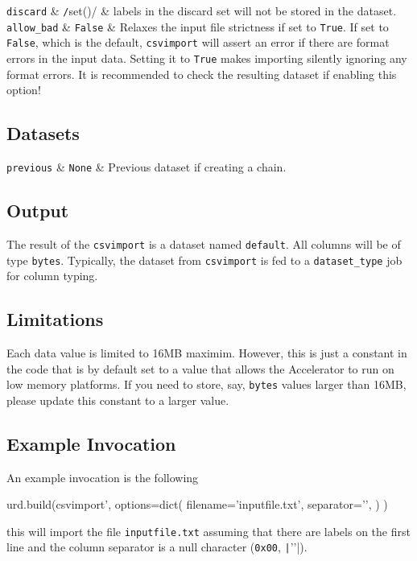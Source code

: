   \RP \texttt{discard} & \texttt/set()/ & labels in the discard set will
  not be stored in the dataset.\\
  
  \RP \texttt{allow\_bad} & \texttt{False} & Relaxes the input file
  strictness if set to \texttt{True}.  If set to \texttt{False}, which
  is the default, \texttt{csvimport} will assert an error if there are
  format errors in the input data.  Setting it to \texttt{True} makes
  importing silently ignoring any format errors.  It is recommended to
  check the resulting dataset if enabling this option!\\
\stoptable



\subsection{Datasets}

\starttable
  \RP \texttt{previous} & \texttt{None} & Previous dataset if creating a
  chain.\\
\stoptable



\subsection{Output}
The result of the \texttt{csvimport} is a dataset named
\texttt{default}.  All columns will be of type
\texttt{bytes}.  Typically, the dataset from
\texttt{csvimport} is fed to a \texttt{dataset\_type} job for column
typing.


\subsection{Limitations}
Each data value is limited to 16MB maximim.  However, this is just a
constant in the code that is by default set to a value that allows the
Accelerator to run on low memory platforms.  If you need to store,
say, \texttt{bytes} values larger than 16MB, please update this
constant to a larger value.



\subsection{Example Invocation}
An example invocation is the following

\begin{python}
urd.build(csvimport',
    options=dict(
        filename='inputfile.txt',
        separator='\0',
    )
)
\end{python}
this will import the file \texttt{inputfile.txt} assuming that there
are labels on the first line and the column separator is a null
character (\texttt{0x00}, \texttt|'\0'|).


